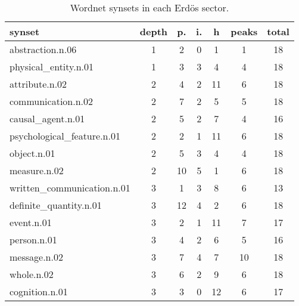 \begin{table}[h!]
\begin{center}
\begin{tabular}{| l | c | c | c | c | c | c |}\hline
synset & depth & p. & i. & h & peaks & total \\\hline
abstraction.n.06 & 1  & 2  & 0  & 1  & 1  & 18 \\\hline
physical\_entity.n.01 & 1  & 3  & 3  & 4  & 4  & 18 \\\hline
attribute.n.02 & 2  & 4  & 2  & 11  & 6  & 18 \\\hline
communication.n.02 & 2  & 7  & 2  & 5  & 5  & 18 \\\hline
causal\_agent.n.01 & 2  & 5  & 2  & 7  & 4  & 16 \\\hline
psychological\_feature.n.01 & 2  & 2  & 1  & 11  & 6  & 18 \\\hline
object.n.01 & 2  & 5  & 3  & 4  & 4  & 18 \\\hline
measure.n.02 & 2  & 10  & 5  & 1  & 6  & 18 \\\hline
written\_communication.n.01 & 3  & 1  & 3  & 8  & 6  & 13 \\\hline
definite\_quantity.n.01 & 3  & 12  & 4  & 2  & 6  & 18 \\\hline
event.n.01 & 3  & 2  & 1  & 11  & 7  & 17 \\\hline
person.n.01 & 3  & 4  & 2  & 6  & 5  & 16 \\\hline
message.n.02 & 3  & 7  & 4  & 7  & 10  & 18 \\\hline
whole.n.02 & 3  & 6  & 2  & 9  & 6  & 18 \\\hline
cognition.n.01 & 3  & 3  & 0  & 12  & 6  & 17 \\\hline
\end{tabular}
\caption{Wordnet synsets in each Erd\"os sector.}
\end{center}
\end{table}